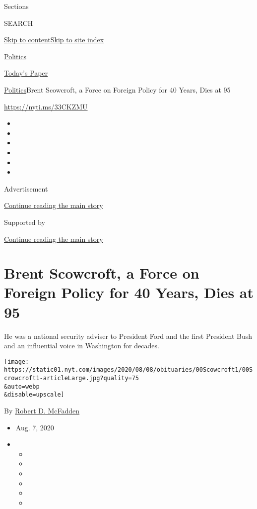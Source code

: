Sections

SEARCH

\protect\hyperlink{site-content}{Skip to
content}\protect\hyperlink{site-index}{Skip to site index}

\href{https://www.nytimes.com/section/politics}{Politics}

\href{https://myaccount.nytimes.com/auth/login?response_type=cookie\&client_id=vi}{}

\href{https://www.nytimes.com/section/todayspaper}{Today's Paper}

\href{/section/politics}{Politics}\textbar{}Brent Scowcroft, a Force on
Foreign Policy for 40 Years, Dies at 95

\href{https://nyti.ms/33CKZMU}{https://nyti.ms/33CKZMU}

\begin{itemize}
\item
\item
\item
\item
\item
\item
\end{itemize}

Advertisement

\protect\hyperlink{after-top}{Continue reading the main story}

Supported by

\protect\hyperlink{after-sponsor}{Continue reading the main story}

\hypertarget{brent-scowcroft-a-force-on-foreign-policy-for-40-years-dies-at-95}{%
\section{Brent Scowcroft, a Force on Foreign Policy for 40 Years, Dies
at
95}\label{brent-scowcroft-a-force-on-foreign-policy-for-40-years-dies-at-95}}

He was a national security adviser to President Ford and the first
President Bush and an influential voice in Washington for decades.

\texttt{[image: https://static01.nyt.com/images/2020/08/08/obituaries/00Scowcroft1/00Scrowcroft1-articleLarge.jpg?quality=75\\\&auto=webp\\\&disable=upscale]}

By \href{https://www.nytimes.com/by/robert-d-mcfadden}{Robert D.
McFadden}

\begin{itemize}
\item
  Aug. 7, 2020
\item
  \begin{itemize}
  \item
  \item
  \item
  \item
  \item
  \item
  \end{itemize}
\end{itemize}

